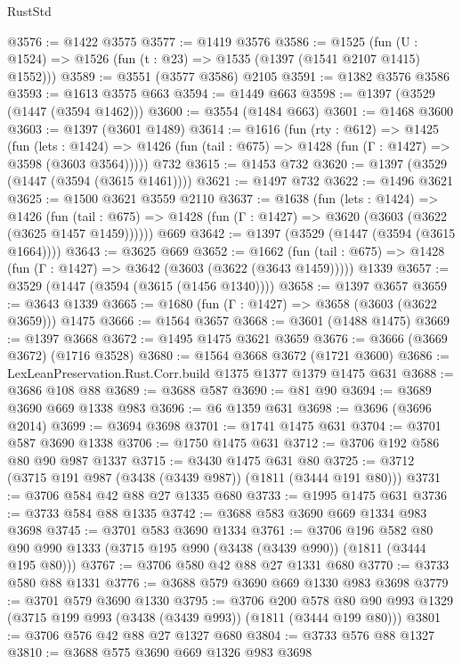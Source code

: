 \begin{lexlean}{RustStd}
\begin{coremodule}
@3576 := @1422 @3575
@3577 := @1419 @3576
@3586 := @1525 (fun (U : @1524) => @1526 (fun (t : @23) => @1535 (@1397 (@1541 @2107 @1415) @1552)))
@3589 := @3551 (@3577 @3586) @2105
@3591 := @1382 @3576 @3586
@3593 := @1613 @3575 @663
@3594 := @1449 @663
@3598 := @1397 (@3529 (@1447 (@3594 @1462)))
@3600 := @3554 (@1484 @663)
@3601 := @1468 @3600
@3603 := @1397 (@3601 @1489)
@3614 := @1616
    (fun (rty : @612) =>
    @1425
      (fun (lets : @1424) =>
      @1426 (fun (tail : @675) => @1428 (fun (Γ : @1427) => @3598 (@3603 @3564)))))
    @732
@3615 := @1453 @732
@3620 := @1397 (@3529 (@1447 (@3594 (@3615 @1461))))
@3621 := @1497 @732
@3622 := @1496 @3621
@3625 := @1500 @3621 @3559 @2110
@3637 := @1638
    (fun (lets : @1424) =>
    @1426
      (fun (tail : @675) => @1428 (fun (Γ : @1427) => @3620 (@3603 (@3622 (@3625 @1457 @1459))))))
    @669
@3642 := @1397 (@3529 (@1447 (@3594 (@3615 @1664))))
@3643 := @3625 @669
@3652 := @1662
    (fun (tail : @675) => @1428 (fun (Γ : @1427) => @3642 (@3603 (@3622 (@3643 @1459)))))
    @1339
@3657 := @3529 (@1447 (@3594 (@3615 (@1456 @1340))))
@3658 := @1397 @3657
@3659 := @3643 @1339
@3665 := @1680 (fun (Γ : @1427) => @3658 (@3603 (@3622 @3659))) @1475
@3666 := @1564 @3657
@3668 := @3601 (@1488 @1475)
@3669 := @1397 @3668
@3672 := @1495 @1475 @3621 @3659
@3676 := @3666 (@3669 @3672) (@1716 @3528)
@3680 := @1564 @3668 @3672 (@1721 @3600)
@3686 := LexLeanPreservation.Rust.Corr.build @1375 @1377 @1379 @1475 @631
@3688 := @3686 @108 @88
@3689 := @3688 @587
@3690 := @81 @90
@3694 := @3689 @3690 @669 @1338 @983
@3696 := @6 @1359 @631
@3698 := @3696 (@3696 @2014)
@3699 := @3694 @3698
@3701 := @1741 @1475 @631
@3704 := @3701 @587 @3690 @1338
@3706 := @1750 @1475 @631
@3712 := @3706 @192 @586 @80 @90 @987 @1337
@3715 := @3430 @1475 @631 @80
@3725 := @3712 (@3715 @191 @987 (@3438 (@3439 @987)) (@1811 (@3444 @191 @80)))
@3731 := @3706 @584 @42 @88 @27 @1335 @680
@3733 := @1995 @1475 @631
@3736 := @3733 @584 @88 @1335
@3742 := @3688 @583 @3690 @669 @1334 @983 @3698
@3745 := @3701 @583 @3690 @1334
@3761 := @3706
    @196
    @582
    @80
    @90
    @990
    @1333
    (@3715 @195 @990 (@3438 (@3439 @990)) (@1811 (@3444 @195 @80)))
@3767 := @3706 @580 @42 @88 @27 @1331 @680
@3770 := @3733 @580 @88 @1331
@3776 := @3688 @579 @3690 @669 @1330 @983 @3698
@3779 := @3701 @579 @3690 @1330
@3795 := @3706
    @200
    @578
    @80
    @90
    @993
    @1329
    (@3715 @199 @993 (@3438 (@3439 @993)) (@1811 (@3444 @199 @80)))
@3801 := @3706 @576 @42 @88 @27 @1327 @680
@3804 := @3733 @576 @88 @1327
@3810 := @3688 @575 @3690 @669 @1326 @983 @3698

\end{coremodule}
\end{lexlean}
